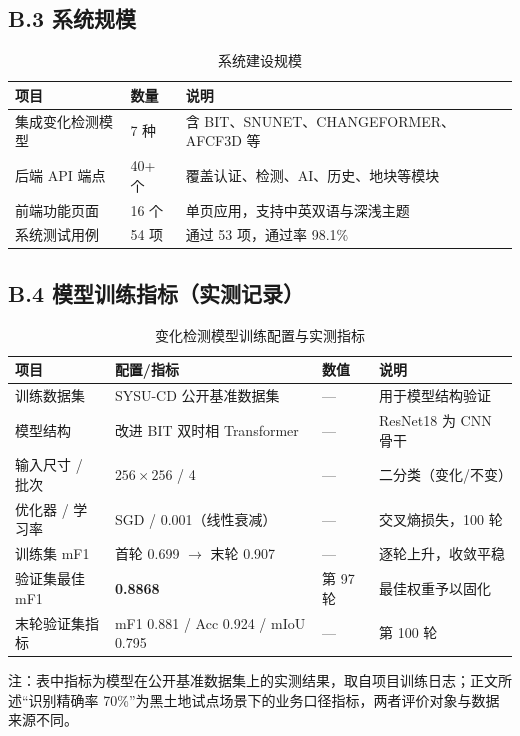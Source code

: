 \documentclass[12pt, a4paper]{ctexart}
\begin{document}
\subsection{B.3 系统规模}

\begin{table}[htbp]
    \centering
    \caption{系统建设规模}
    \label{tab:scale}
    \small
    \begin{tabular}{|p{5.4cm}|p{2.6cm}|p{6.4cm}|}
        \hline
        \textbf{项目} & \textbf{数量} & \textbf{说明} \\
        \hline
        集成变化检测模型 & 7 种 & 含 BIT、SNUNET、CHANGEFORMER、AFCF3D 等 \\
        \hline
        后端 API 端点 & 40+ 个 & 覆盖认证、检测、AI、历史、地块等模块 \\
        \hline
        前端功能页面 & 16 个 & 单页应用，支持中英双语与深浅主题 \\
        \hline
        系统测试用例 & 54 项 & 通过 53 项，通过率 98.1\% \\
        \hline
    \end{tabular}
\end{table}

\subsection{B.4 模型训练指标（实测记录）}

\begin{table}[htbp]
    \centering
    \caption{变化检测模型训练配置与实测指标}
    \label{tab:train}
    \small
    \begin{tabular}{|p{3.4cm}|p{4.6cm}|p{2.4cm}|p{4.0cm}|}
        \hline
        \textbf{项目} & \textbf{配置/指标} & \textbf{数值} & \textbf{说明} \\
        \hline
        训练数据集 & SYSU-CD 公开基准数据集 & — & 用于模型结构验证 \\
        \hline
        模型结构 & 改进 BIT 双时相 Transformer & — & ResNet18 为 CNN 骨干 \\
        \hline
        输入尺寸 / 批次 & $256 \times 256$ / 4 & — & 二分类（变化/不变） \\
        \hline
        优化器 / 学习率 & SGD / 0.001（线性衰减） & — & 交叉熵损失，100 轮 \\
        \hline
        训练集 mF1 & 首轮 0.699 $\rightarrow$ 末轮 0.907 & — & 逐轮上升，收敛平稳 \\
        \hline
        验证集最佳 mF1 & \textbf{0.8868} & 第 97 轮 & 最佳权重予以固化 \\
        \hline
        末轮验证集指标 & mF1 0.881 / Acc 0.924 / mIoU 0.795 & — & 第 100 轮 \\
        \hline
    \end{tabular}
    \par\vspace{2pt}
    {\footnotesize 注：表中指标为模型在公开基准数据集上的实测结果，取自项目训练日志；正文所述“识别精确率 70\%”为黑土地试点场景下的业务口径指标，两者评价对象与数据来源不同。}
\end{table}
\end{document}
